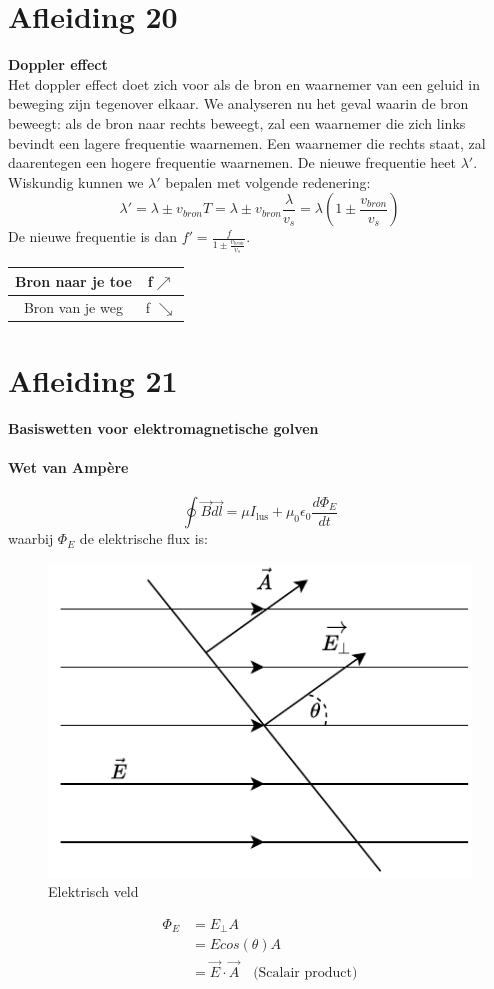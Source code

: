 \documentclass[a4paper,kul]{kulakarticle} %
\begin{document}
\section{Afleiding 20}
\textbf{Doppler effect}\\
Het doppler effect doet zich voor als de bron en waarnemer van een geluid in beweging zijn tegenover elkaar. We analyseren nu het geval waarin de bron beweegt: als de bron naar rechts beweegt,  zal een waarnemer die zich links bevindt een lagere frequentie waarnemen. Een waarnemer die rechts staat, zal daarentegen een hogere frequentie waarnemen. De nieuwe frequentie heet $\lambda'$. Wiskundig kunnen we $\lambda'$ bepalen met volgende redenering:
\begin{equation*}
	\lambda'=\lambda\pm v_{bron}T=\lambda\pm v_{bron}\frac{\lambda}{v_s}=\lambda(1\pm\frac{v_{bron}}{v_s})
\end{equation*}
De nieuwe frequentie is dan $f'=\frac{f}{1\pm\frac{v_{bron}}{v_s}}$.
\begin{center}
	\begin{tabular}{|c|c|}
		\hline
		Bron naar je toe  & f$\nearrow$ \\
		\hline
		Bron van je weg & f $\searrow$\\
		\hline
	\end{tabular}
	
\end{center}
\newpage
\section{Afleiding 21}
\textbf{Basiswetten voor elektromagnetische golven}\\
\paragraph{Wet van Ampère}
\begin{equation*}
	\oint\vec{B}\vec{dl}=\mu I_{\text{lus}}+\mu_0\epsilon_0\frac{d\Phi_E}{dt}
\end{equation*}
waarbij $\Phi_E$ de elektrische flux is:
\begin{figure}[h]
	\centering
	\includegraphics[width=0.5\linewidth]{ElektrischVeld}
	\caption[Elektrisch veld]{Elektrisch veld}
	\label{fig:elektrischveld}
\end{figure}
\begin{align*}
	\Phi_E &= E_{\perp}A\\
	&= Ecos(\theta)A\\
	&= \vec{E}\cdot\vec{A}\quad\text{(Scalair product)}
\end{align*}
\end{document}

